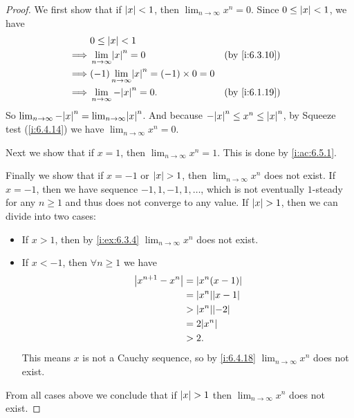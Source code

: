 \begin{proof}
  We first show that if \(\left\lvert x\right\rvert < 1\), then \(\lim_{n \to \infty} x^n = 0\).
  Since \(0 \leq \left\lvert x\right\rvert < 1\), we have
  \begin{align*}
             & 0 \leq \abs{x} < 1                                                       \\
    \implies & \lim_{n \to \infty} \abs{x}^n = 0                     &  & \by{i:6.3.10} \\
    \implies & (-1)\lim_{n \to \infty} \abs{x}^n = (-1) \times 0 = 0                    \\
    \implies & \lim_{n \to \infty} -\abs{x}^n = 0.                   &  & \by{i:6.1.19}
  \end{align*}
  So \(\lim_{n \to \infty} -\abs{x}^n = \lim_{n \to \infty} \abs{x}^n\).
  And because \(-\abs{x}^n \leq x^n \leq \abs{x}^n\), by Squeeze test (\cref{i:6.4.14}) we have \(\lim_{n \to \infty} x^n = 0\).

  Next we show that if \(x = 1\), then \(\lim_{n \to \infty} x^n = 1\).
  This is done by \cref{i:ac:6.5.1}.

  Finally we show that if \(x = -1\) or \(\left\lvert x\right\rvert > 1\), then \(\lim_{n \to \infty} x^n\) does not exist.
  If \(x = -1\), then we have sequence \(-1, 1, -1, 1, \dots\), which is not eventually \(1\)-steady for any \(n \geq 1\) and thus does not converge to any value.
  If \(\left\lvert x\right\rvert > 1\), then we can divide into two cases:
  \begin{itemize}
    \item If \(x > 1\), then by \cref{i:ex:6.3.4} \(\lim_{n \to \infty} x^n\) does not exist.
    \item If \(x < -1\), then \(\forall n \geq 1\) we have
          \begin{align*}
            \abs{x^{n + 1} - x^n} & = \abs{x^n(x - 1)}     \\
                                  & = \abs{x^n}\abs{x - 1} \\
                                  & > \abs{x^n}\abs{-2}    \\
                                  & = 2\abs{x^n}           \\
                                  & > 2.
          \end{align*}
          This means \(x\) is not a Cauchy sequence, so by \cref{i:6.4.18} \(\lim_{n \to \infty} x^n\) does not exist.
  \end{itemize}
  From all cases above we conclude that if \(\left\lvert x\right\rvert > 1\) then \(\lim_{n \to \infty} x^n\) does not exist.
\end{proof}


